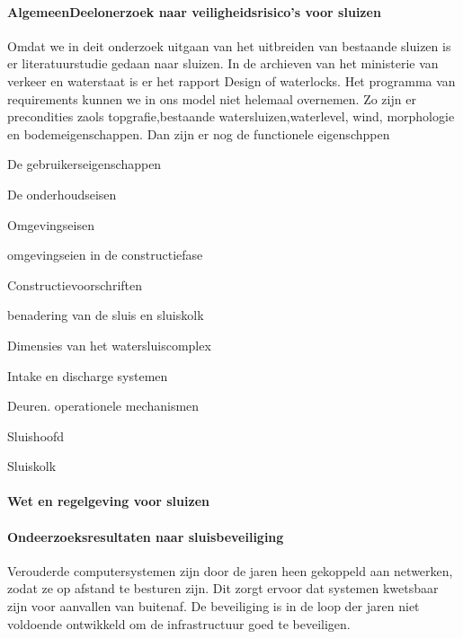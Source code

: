  




\paragraph{AlgemeenDeelonerzoek naar veiligheidsrisico's voor sluizen}
Omdat we in deit onderzoek uitgaan van het uitbreiden van bestaande sluizen is er literatuurstudie gedaan naar sluizen. In de archieven van het ministerie van verkeer en waterstaat is er het rapport Design of waterlocks\cite{CivilEngineeringDivision}.
Het programma van requirements kunnen we in ons model niet helemaal overnemen. 
Zo zijn er precondities zaols topgrafie,bestaande watersluizen,waterlevel, wind, morphologie en bodemeigenschappen.
Dan zijn er nog de functionele eigenschppen


De gebruikerseigenschappen

De onderhoudseisen

Omgevingseisen

omgevingseien in de constructiefase

Constructievoorschriften

benadering van de sluis en sluiskolk

Dimensies van het watersluiscomplex


Intake en discharge systemen

Deuren. operationele mechanismen



Sluishoofd


Sluiskolk

\paragraph{Wet en regelgeving voor sluizen}

\paragraph{Ondeerzoeksresultaten naar sluisbeveiliging}



Verouderde computersystemen zijn door de jaren heen gekoppeld aan netwerken, zodat ze op afstand te besturen zijn. Dit zorgt ervoor dat systemen kwetsbaar zijn voor aanvallen van buitenaf. De beveiliging is in de loop der jaren niet voldoende ontwikkeld om de infrastructuur goed te beveiligen.

